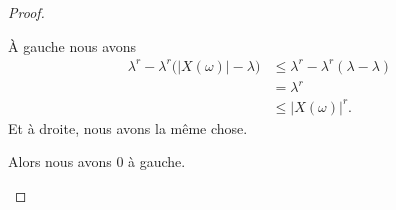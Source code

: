 \begin{proof}
\begin{subproof}
\begin{subproof}
\begin{subproof}
				À gauche nous avons
				\begin{subequations}
					\begin{align}
						\lambda^r-\lambda^r\big( | X(\omega) |-\lambda \big) & \leq \lambda^r-\lambda^r(\lambda-\lambda) \\
						                                                     & =\lambda^r                                \\
						                                                     & \leq | X(\omega) |^r.
					\end{align}
				\end{subequations}
				Et à droite, nous avons la même chose.

				Alors nous avons \( 0\) à gauche.
			\end{subproof}


\end{subproof}
\end{subproof}
\end{proof}
